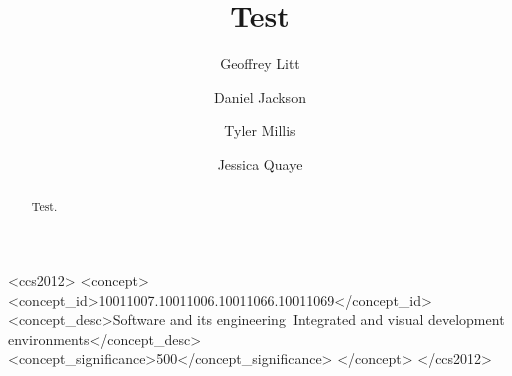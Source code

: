 \documentclass[sigplan,screen,10pt,anonymous,review]{acmart}
\begin{document}
\title{Test}


\author{Geoffrey Litt}

\author{Daniel Jackson}

\author{Tyler Millis}

\author{Jessica Quaye}


\begin{abstract}
  Test.
\end{abstract}

\begin{CCSXML}
<ccs2012>
<concept>
<concept_id>10011007.10011006.10011066.10011069</concept_id>
<concept_desc>Software and its engineering~Integrated and visual development environments</concept_desc>
<concept_significance>500</concept_significance>
</concept>
</ccs2012>
\end{CCSXML}

\end{document}
